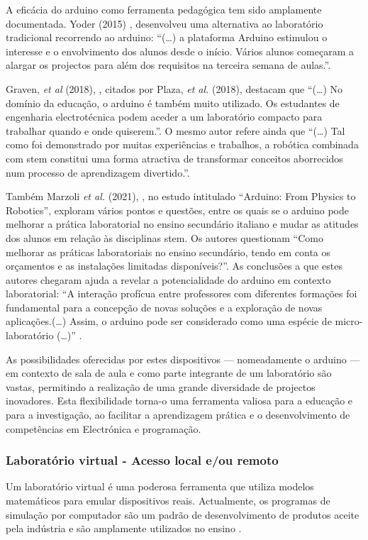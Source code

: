 A eficácia do \gls{arduino} como ferramenta pedagógica tem sido amplamente documentada. Yoder (2015) \cite{yoder}, desenvolveu uma alternativa ao laboratório tradicional recorrendo ao \gls{arduino}: ``(\dots) a plataforma Arduino estimulou o interesse e o envolvimento dos alunos desde o início. Vários alunos começaram a alargar os projectos para além dos requisitos na terceira semana de aulas.''.

Graven, \textit{et al} (2018), \cite{graven}, citados por Plaza, \textit{et al.} (2018), \cite{plaza} destacam que ``(\ldots) No domínio da educação, o \gls{arduino} é também muito utilizado. Os estudantes de engenharia electrotécnica podem aceder a um laboratório compacto para trabalhar quando e onde quiserem.''. O mesmo autor refere ainda que ``(\ldots) Tal como foi demonstrado por muitas experiências e trabalhos, a robótica combinada com \acrshort{stem} constitui uma forma atractiva de transformar conceitos aborrecidos num processo de aprendizagem divertido.''.

Também Marzoli \textit{et al.} (2021), \cite{Marzoli}, no estudo intitulado ``Arduino: From Physics to Robotics'', exploram vários pontos e questões, entre os quais se o \gls{arduino} pode melhorar a prática laboratorial no ensino secundário italiano e mudar as atitudes dos alunos em relação às disciplinas \acrshort{stem}. Os autores questionam ``Como melhorar as práticas laboratoriais no ensino secundário, tendo em conta os orçamentos e as instalações limitadas disponíveis?''. As conclusões a que estes autores chegaram ajuda a revelar a potencialidade do \gls{arduino} em contexto laboratorial: ``A interação profícua entre professores com diferentes formações foi fundamental para a concepção de novas soluções e a exploração de novas aplicações.(\ldots) Assim, o \gls{arduino} pode ser considerado como uma espécie de micro-laboratório (\ldots)'' \cite{Marzoli}.

As possibilidades oferecidas por estes dispositivos — nomeadamente o \gls{arduino} — em contexto de sala de aula e como parte integrante de um laboratório são vastas, permitindo a realização de uma grande diversidade de projectos inovadores. Esta flexibilidade torna-o uma ferramenta valiosa para a educação e para a investigação, ao facilitar a aprendizagem prática e o desenvolvimento de competências em Electrónica e programação.

\subsubsection{Laboratório virtual - Acesso local e/ou remoto}
Um laboratório virtual é uma poderosa ferramenta que utiliza modelos matemáticos para emular dispositivos reais. Actualmente, os programas de simulação por computador são um padrão de desenvolvimento de produtos aceite pela indústria e são amplamente utilizados no ensino \cite{HERADIO20161, POTKONJAK2016309}.

